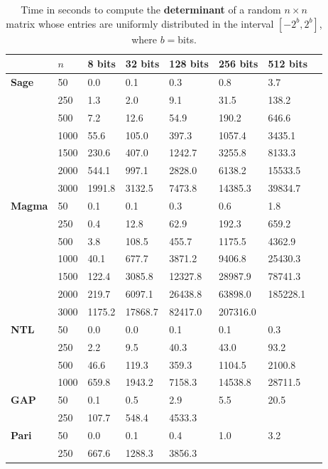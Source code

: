\documentclass[preprint,12pt]{elsarticle}
\theoremstyle{plain}
\theoremstyle{definition}
\numberwithin{equation}{section}
\numberwithin{figure}{section}
\numberwithin{table}{section}
\begin{document}
{
\begin{table}[ht]
  \caption{Time in seconds to 
    compute the {\bf determinant} of a random $n\times n$ matrix whose entries are uniformly distributed
    in the interval $[-2^b,2^b]$, where $b=$bits. \label{tabdet}}
  \small\begin{center}
    
\begin{tabular}{|l|l|l|l|l|l|l|l|}\hline
& $n$ & 8 bits & 32 bits  & 128 bits  & 256 bits & 512 bits\\\hline 
{\bf Sage} & 50 & 0.0 & 0.1 & 0.3 & 0.8 & 3.7\\
& 250 & 1.3 & 2.0 & 9.1 & 31.5 & 138.2\\
& 500 & 7.2 & 12.6 & 54.9 & 190.2 & 646.6\\
& 1000 & 55.6 & 105.0 & 397.3 & 1057.4 & 3435.1\\
& 1500 & 230.6 & 407.0 & 1242.7 & 3255.8 & 8133.3\\
& 2000 & 544.1 & 997.1 & 2828.0 & 6138.2 & 15533.5\\
& 3000 & 1991.8 & 3132.5 & 7473.8 & 14385.3 & 39834.7\\\hline

{\bf Magma} & 50 & 0.1 & 0.1 & 0.3 & 0.6 & 1.8\\
& 250 & 0.4 & 12.8 & 62.9 & 192.3 & 659.2\\
& 500 & 3.8 & 108.5 & 455.7 & 1175.5 & 4362.9\\
& 1000 & 40.1 & 677.7 & 3871.2 & 9406.8 & 25430.3\\
& 1500 & 122.4 & 3085.8 & 12327.8 & 28987.9 & 78741.3\\
& 2000 & 219.7 & 6097.1 & 26438.8 & 63898.0 & 185228.1\\
& 3000 & 1175.2 & 17868.7 & 82417.0 & 207316.0 & \\
\hline
{\bf NTL}
&50 & 0.0 & 0.0 & 0.1 & 0.1 & 0.3\\
&250 & 2.2 & 9.5 & 40.3 & 43.0 & 93.2\\
&500 & 46.6 & 119.3 & 359.3  & 1104.5 & 2100.8 \\
&1000 & 659.8 & 1943.2 & 7158.3 & 14538.8 & 28711.5\\

\hline
{\bf GAP}
&50 & 0.1 & 0.5 & 2.9 & 5.5 & 20.5\\
&250 & 107.7 & 548.4 & 4533.3 &  & \\


\hline
{\bf Pari}
&50 & 0.0 & 0.1 & 0.4 & 1.0 & 3.2\\
&250 & 667.6 & 1288.3 & 3856.3 &  & \\
\hline\end{tabular}
\end{center}
\end{table}
}
\end{document}
